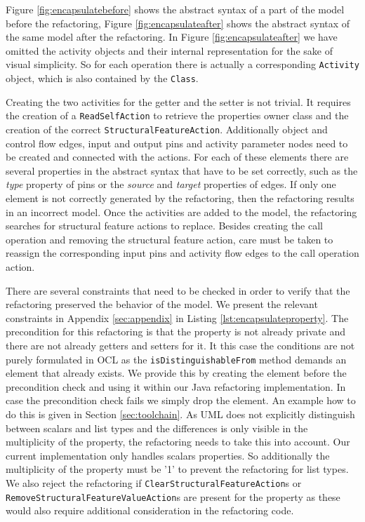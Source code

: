 \documentclass{llncs}
\begin{document}
Figure \ref{fig:encapsulatebefore} shows the abstract syntax of a part of the model before the refactoring, 
Figure \ref{fig:encapsulateafter} shows the abstract syntax of the same model after the refactoring. In Figure \ref{fig:encapsulateafter} 
we have omitted the activity objects and their internal representation for the sake of visual simplicity. So for each operation 
there is actually a corresponding \texttt{Activity} object, which is also contained by the \texttt{Class}.

Creating the two activities for the getter and the setter is not trivial. It requires the creation of
a \texttt{Read\-Self\-Action} to retrieve the properties owner class and the creation of the correct \texttt{Structural\-Feature\-Action}.
Additionally object and control flow edges, input and output pins and activity parameter nodes need to be created and connected with the 
actions. For each of these elements there are several properties in the abstract syntax that have to be set correctly, such as the 
\textit{type} property of pins or the \textit{source} and \textit{target} properties of edges. If only one element is not correctly 
generated by the refactoring, then the refactoring results in an incorrect model. Once the activities are added to the model, the 
refactoring searches for structural feature actions to replace. Besides creating the call operation and removing the structural feature 
action, care must be taken to reassign the corresponding input pins and activity flow edges to the call operation action.

There are several constraints that need to be checked in order to verify that the refactoring preserved the behavior of the model. 
We present the relevant constraints in Appendix \ref{sec:appendix} in Listing \ref{lst:encapsulateproperty}.
The precondition for this refactoring is that the property is not already private and there are not already getters 
and setters for it. It this case the conditions are not purely formulated in OCL as the \texttt{is\-Distinguishable\-From} method 
demands an element that already exists. We provide this by creating the element before the precondition check and using it 
within our Java refactoring implementation. In case the precondition check fails we simply drop the element. An example how 
to do this is given in Section \ref{sec:toolchain}. 
As UML does not explicitly distinguish between scalars and list types and the differences is only visible
in the multiplicity of the property, the refactoring needs to take this into account. Our current implementation only handles
scalars properties. So additionally the multiplicity of the property must be '1' to prevent the refactoring for list types. We also reject 
the refactoring if \texttt{Clear\-Structural\-Feature\-Action}s or \texttt{Remove\-Structural\-Feature\-Value\-Action}s are present for 
the property as these would also require additional consideration in the refactoring code.
\end{document}
